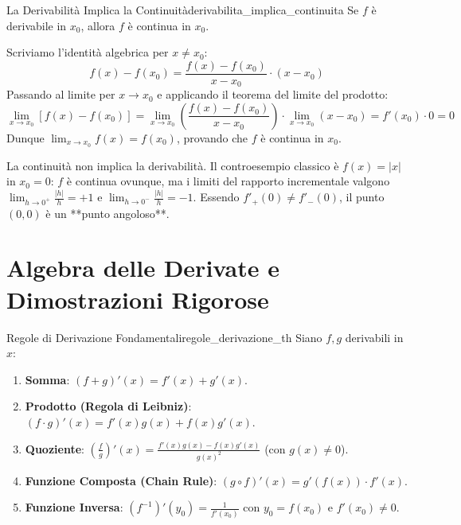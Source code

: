 \begin{teorema}{La Derivabilità Implica la Continuità}{derivabilita_implica_continuita}
Se $f$ è derivabile in $x_0$, allora $f$ è continua in $x_0$.
\end{teorema}

\begin{dimostrazione}
Scriviamo l'identità algebrica per $x \neq x_0$:
\[
    f(x) - f(x_0) = \frac{f(x) - f(x_0)}{x - x_0} \cdot (x - x_0)
\]
Passando al limite per $x \to x_0$ e applicando il teorema del limite del prodotto:
\[
    \lim_{x \to x_0} [f(x) - f(x_0)] = \lim_{x \to x_0} \left( \frac{f(x) - f(x_0)}{x - x_0} \right) \cdot \lim_{x \to x_0} (x - x_0) = f'(x_0) \cdot 0 = 0
\]
Dunque $\lim_{x \to x_0} f(x) = f(x_0)$, provando che $f$ è continua in $x_0$.
\end{dimostrazione}

\begin{osservazione}
La continuità non implica la derivabilità. Il controesempio classico è $f(x) = |x|$ in $x_0 = 0$: $f$ è continua ovunque, ma i limiti del rapporto incrementale valgono $\lim_{h \to 0^+} \frac{|h|}{h} = +1$ e $\lim_{h \to 0^-} \frac{|h|}{h} = -1$. Essendo $f'_+(0) \neq f'_-(0)$, il punto $(0, 0)$ è un **punto angoloso**.
\end{osservazione}

\section{Algebra delle Derivate e Dimostrazioni Rigorose}
\label{sec:algebra_derivate_dimostrazioni}

\begin{teorema}{Regole di Derivazione Fondamentali}{regole_derivazione_th}
Siano $f, g$ derivabili in $x$:
\begin{enumerate}
    \item \textbf{Somma}: $(f + g)'(x) = f'(x) + g'(x)$.
    \item \textbf{Prodotto (Regola di Leibniz)}: $(f \cdot g)'(x) = f'(x)g(x) + f(x)g'(x)$.
    \item \textbf{Quoziente}: $\left(\frac{f}{g}\right)'(x) = \frac{f'(x)g(x) - f(x)g'(x)}{g(x)^2}$ (con $g(x) \neq 0$).
    \item \textbf{Funzione Composta (Chain Rule)}: $(g \circ f)'(x) = g'(f(x)) \cdot f'(x)$.
    \item \textbf{Funzione Inversa}: $(f^{-1})'(y_0) = \frac{1}{f'(x_0)}$ con $y_0 = f(x_0)$ e $f'(x_0) \neq 0$.
\end{enumerate}
\end{teorema}

